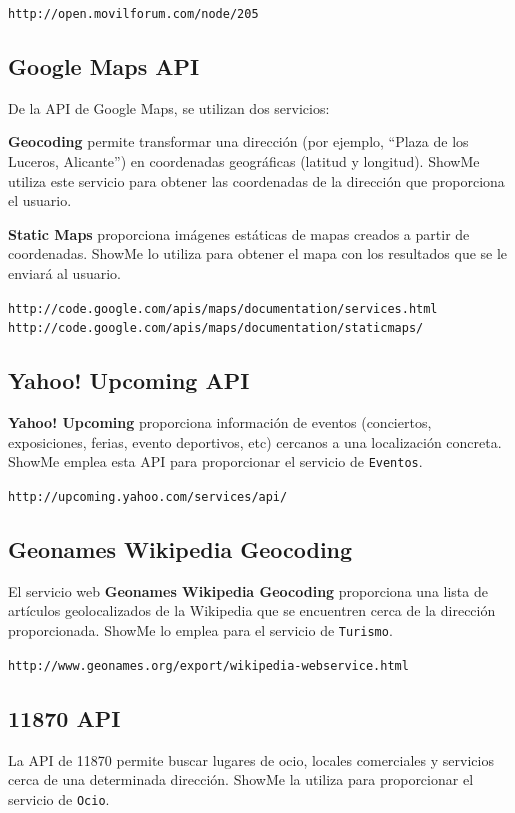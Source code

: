 \documentclass[11pt, a4paper, oneside]{article}
\begin{document}
\texttt{http://open.movilforum.com/node/205}

\subsection*{Google Maps API}
De la API de Google Maps, se utilizan dos servicios:

\textbf{Geocoding} permite transformar una dirección (por ejemplo, ``Plaza de los Luceros, Alicante'') en coordenadas geográficas (latitud y longitud). ShowMe utiliza este servicio para obtener las coordenadas de la dirección que proporciona el usuario.

\textbf{Static Maps} proporciona imágenes estáticas de mapas creados a partir de coordenadas. ShowMe lo utiliza para obtener el mapa con los resultados que se le enviará al usuario.

\texttt{http://code.google.com/apis/maps/documentation/services.html}\\
\texttt{http://code.google.com/apis/maps/documentation/staticmaps/}

\subsection*{Yahoo! Upcoming API}
\textbf{Yahoo! Upcoming} proporciona información de eventos (conciertos, exposiciones, ferias, evento deportivos, etc) cercanos a una localización concreta. ShowMe emplea esta API para proporcionar el servicio de \texttt{Eventos}.

\texttt{http://upcoming.yahoo.com/services/api/}

\subsection*{Geonames Wikipedia Geocoding}
El servicio web \textbf{Geonames Wikipedia Geocoding} proporciona una lista de artículos geolocalizados de la Wikipedia que se encuentren cerca de la dirección proporcionada. ShowMe lo emplea para el servicio de \texttt{Turismo}.

\texttt{http://www.geonames.org/export/wikipedia-webservice.html}

\subsection{11870 API}

La API de 11870 permite buscar lugares de ocio, locales comerciales y servicios cerca de una determinada dirección. ShowMe la utiliza para proporcionar el servicio de \texttt{Ocio}.
\end{document}
